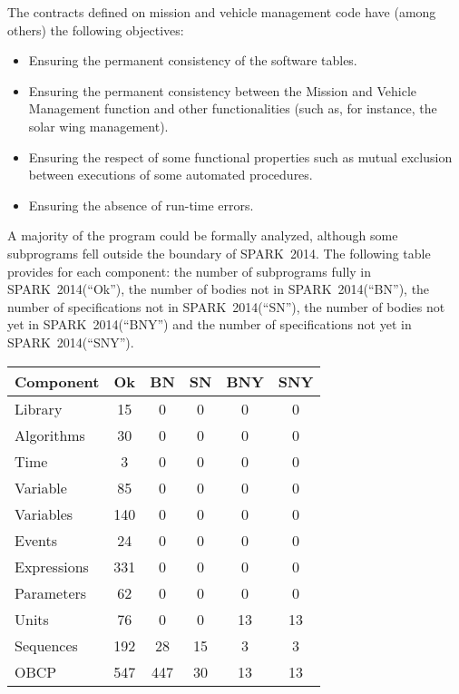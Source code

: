 \documentclass[10pt,a4paper,twocolumn]{article}
\newcommand{\newspark}{SPARK~2014\xspace}
\begin{document}
The contracts defined on mission and vehicle management code have (among others)
the following objectives:

\begin{itemize}
\item Ensuring the permanent consistency of the software tables.
\item Ensuring the permanent consistency between the Mission and Vehicle Management function and other functionalities (such as, for instance, the solar wing management).
\item Ensuring the respect of some functional properties such as mutual exclusion between executions of some automated procedures.
\item Ensuring the absence of run-time errors.
\end{itemize}


A majority of the program could be formally analyzed, although some subprograms
fell outside the boundary of \newspark.
The following table provides for each component:
the number of subprograms fully in \newspark (``Ok''),
the number of bodies not in \newspark (``BN''),
the number of specifications not in \newspark (``SN''),
the number of bodies not yet in \newspark (``BNY'') and
the number of specifications not yet in \newspark (``SNY'').

\vspace{5mm}

\begin{tabular}{|l|c|c|c|c|c|}
\hline
Component   & Ok  & BN  & SN & BNY & SNY \\
\hline
Library     &  15 &   0 &  0 &   0 &   0 \\
\hline
Algorithms  &  30 &   0 &  0 &   0 &   0 \\
\hline
Time        &   3 &   0 &  0 &   0 &   0 \\
\hline
Variable    &  85 &   0 &  0 &   0 &   0 \\
\hline
Variables   & 140 &   0 &  0 &   0 &   0 \\
\hline
Events      &  24 &   0 &  0 &   0 &   0 \\
\hline
Expressions & 331 &   0 &  0 &   0 &   0 \\
\hline
Parameters  &  62 &   0 &  0 &   0 &   0 \\
\hline
Units       &  76 &   0 &  0 &  13 &  13 \\
\hline
Sequences   & 192 &  28 & 15 &   3 &   3 \\
\hline
OBCP        & 547 & 447 & 30 &  13 &  13 \\
\hline
\end{tabular}
\end{document}
